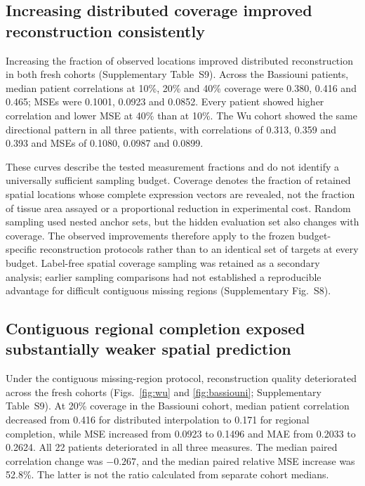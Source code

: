 


\subsection{Increasing distributed coverage improved reconstruction consistently}
Increasing the fraction of observed locations improved distributed reconstruction in both fresh cohorts (Supplementary Table~S9). Across the Bassiouni patients, median patient correlations at 10\%, 20\% and 40\% coverage were 0.380, 0.416 and 0.465; MSEs were 0.1001, 0.0923 and 0.0852. Every patient showed higher correlation and lower MSE at 40\% than at 10\%. The Wu cohort showed the same directional pattern in all three patients, with correlations of 0.313, 0.359 and 0.393 and MSEs of 0.1080, 0.0987 and 0.0899.

These curves describe the tested measurement fractions and do not identify a universally sufficient sampling budget. Coverage denotes the fraction of retained spatial locations whose complete expression vectors are revealed, not the fraction of tissue area assayed or a proportional reduction in experimental cost. Random sampling used nested anchor sets, but the hidden evaluation set also changes with coverage. The observed improvements therefore apply to the frozen budget-specific reconstruction protocols rather than to an identical set of targets at every budget. Label-free spatial coverage sampling was retained as a secondary analysis; earlier sampling comparisons had not established a reproducible advantage for difficult contiguous missing regions (Supplementary Fig.~S8).



\subsection{Contiguous regional completion exposed substantially weaker spatial prediction}
Under the contiguous missing-region protocol, reconstruction quality deteriorated across the fresh cohorts (Figs.~\ref{fig:wu} and \ref{fig:bassiouni}; Supplementary Table~S9). At 20\% coverage in the Bassiouni cohort, median patient correlation decreased from 0.416 for distributed interpolation to 0.171 for regional completion, while MSE increased from 0.0923 to 0.1496 and MAE from 0.2033 to 0.2624. All 22 patients deteriorated in all three measures. The median paired correlation change was $-0.267$, and the median paired relative MSE increase was 52.8\%. The latter is not the ratio calculated from separate cohort medians.

